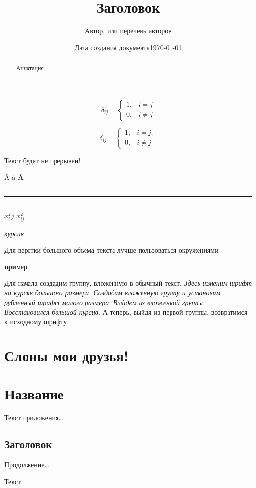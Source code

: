 \documentclass[a4paper,14pt]{extarticle}
\begin{document}
	\title{Заголовок}
	\author{Автор, или перечень авторов}
	\date{Дата создания документа}
	\date\today
	\begin{abstract}
		Аннотация
	\end{abstract}
	\maketitle
	
	$$\delta_{ij}=\begin{cases}1,&i=j\\0,&i\ne j\end{cases}$$
	
	$$\delta_{ij} =
		\begin{cases}
			1, & i=j,\\
			0, & i\ne j
		\end{cases}$$
	
	Текст %
	будет не %
	прерывен! %
	
	\AA
	\aa
	\textbf\AA
	
	\rule[5pt]{25pt}{1pt}
	\rule[-5pt]{1pt}{10pt}
	\rule{6pt}{6pt}
	
	$x^2_ij$
	$x^2_{ij}$
	
	{\itshape курсив}
	
	\begin{itshape}
		Для верстки большого объема текста лучше пользоваться окружениями
	\end{itshape}
	
	\textbf{при}мер
	
	{Для начала создадим группу, вложенную в обычный текст. \it\large Здесь изменим шрифт на курсив большого размера. {\sf\small Создадим вложенную группу и установим рубленный шрифт малого размера.} Выйдем из вложенной группы. Восстановился большой курсив.} А теперь, выйдя из первой группы, возвратимся к исходному шрифту.
	
	\section[О друзьях]{Слоны мои друзья!}\label{s:слоны}
	
	\appendix
	\section{Название}\label{}
		Текст приложения\dots
	\subsection{Заголовок}\label{}
		Продолжение\dots

	\tableofcontents
	
	Текст\footnotemark[1]
	
\end{document}
